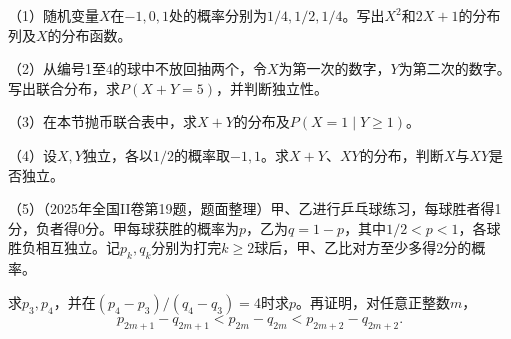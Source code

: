 \begin{exercise}
\mbox{}\par\nobreak

（1）随机变量\(X\)在\(-1,0,1\)处的概率分别为\(1/4,1/2,1/4\)。写出\(X^2\)和\(2X+1\)的分布列及\(X\)的分布函数。

（2）从编号1至4的球中不放回抽两个，令\(X\)为第一次的数字，\(Y\)为第二次的数字。写出联合分布，求\(P(X+Y=5)\)，并判断独立性。

（3）在本节抛币联合表中，求\(X+Y\)的分布及\(P(X=1\mid Y\ge1)\)。

（4）设\(X,Y\)独立，各以\(1/2\)的概率取\(-1,1\)。求\(X+Y\)、\(XY\)的分布，判断\(X\)与\(XY\)是否独立。

（5）（2025年全国II卷第19题，题面整理）甲、乙进行乒乓球练习，每球胜者得1分，负者得0分。甲每球获胜的概率为\(p\)，乙为\(q=1-p\)，其中\(1/2<p<1\)，各球胜负相互独立。记\(p_k,q_k\)分别为打完\(k\ge2\)球后，甲、乙比对方至少多得2分的概率。

求\(p_3,p_4\)，并在\((p_4-p_3)/(q_4-q_3)=4\)时求\(p\)。再证明，对任意正整数\(m\)，
\[
 p_{2m+1}-q_{2m+1}<p_{2m}-q_{2m}<p_{2m+2}-q_{2m+2}.
\]
\end{exercise}
